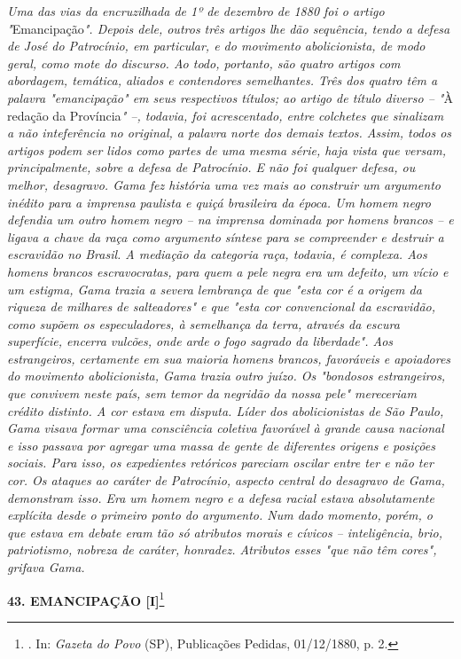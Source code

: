 \emph{Uma das vias da encruzilhada de 1º de dezembro de 1880 foi o
artigo "}Emancipação\emph{". Depois dele, outros três artigos lhe dão
sequência, tendo a defesa de José do Patrocínio, em particular, e do
movimento abolicionista, de modo geral, como mote do discurso. Ao todo,
portanto, são quatro artigos com abordagem, temática, aliados e
contendores semelhantes. Três dos quatro têm a palavra "emancipação" em
seus respectivos títulos; ao artigo de título diverso -- "}À redação da
Província\emph{" --, todavia, foi acrescentado, entre colchetes que
sinalizam a não inteferência no original, a palavra norte dos demais
textos. Assim, todos os artigos podem ser lidos como partes de uma mesma
série, haja vista que versam, principalmente, sobre a defesa de
Patrocínio. E não foi qualquer defesa, ou melhor, desagravo. Gama fez
história uma vez mais ao construir um argumento inédito para a imprensa
paulista e quiçá brasileira da época. Um homem negro defendia um outro
homem negro -- na imprensa dominada por homens brancos -- e ligava a
chave da raça como argumento síntese para se compreender e destruir a
escravidão no Brasil. A mediação da categoria raça, todavia, é complexa.
Aos homens brancos escravocratas, para quem a pele negra era um defeito,
um vício e um estigma, Gama trazia a severa lembrança de que "esta cor é
a origem da riqueza de milhares de salteadores" e que "esta cor
convencional da escravidão, como supõem os especuladores, à semelhança
da terra, através da escura superfície, encerra vulcões, onde arde o
fogo sagrado da liberdade". Aos estrangeiros, certamente em sua maioria
homens brancos, favoráveis e apoiadores do movimento abolicionista, Gama
trazia outro juízo. Os "bondosos estrangeiros, que convivem neste país,
sem temor da negridão da nossa pele" mereceriam crédito distinto. A cor
estava em disputa. Líder dos abolicionistas de São Paulo, Gama visava
formar uma consciência coletiva favorável à grande causa nacional e isso
passava por agregar uma massa de gente de diferentes origens e posições
sociais. Para isso, os expedientes retóricos pareciam oscilar entre ter
e não ter cor. Os ataques ao caráter de Patrocínio, aspecto central do
desagravo de Gama, demonstram isso. Era um homem negro e a defesa racial
estava absolutamente explícita desde o primeiro ponto do argumento. Num
dado momento, porém, o que estava em debate eram tão só atributos morais
e cívicos -- inteligência, brio, patriotismo, nobreza de caráter,
honradez. Atributos esses "que não têm cores", grifava Gama.}

\textbf{43. EMANCIPAÇÃO {[}I{]}}\footnote{. In: \emph{Gazeta do Povo}
  (SP), Publicações Pedidas, 01/12/1880, p. 2.}

